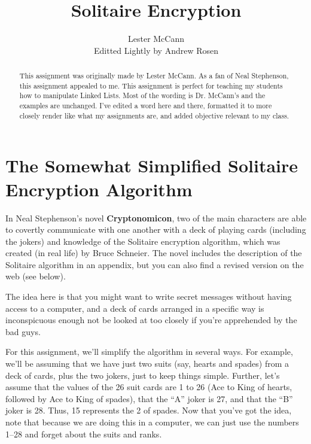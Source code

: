 \documentclass[]{article}
\title{Solitaire Encryption}
\author{Lester McCann\\ Editted Lightly by Andrew Rosen}
\begin{document}
\maketitle
\begin{abstract}
	This assignment was originally made by Lester McCann.  As a fan of Neal Stephenson, this assignment appealed to me.
	This assignment is perfect for teaching my students how to manipulate Linked Lists.  Most of the wording is Dr. McCann's and the examples are unchanged.  I've edited a word here and there, formatted it to more closely render like what my assignments are, and added objective relevant to my class.
\end{abstract}

\section{The Somewhat Simplified Solitaire Encryption Algorithm}


In Neal Stephenson's novel \textbf{Cryptonomicon}, two of the main
characters are able to covertly communicate with one another with a deck
of playing cards (including the jokers) and knowledge of the Solitaire
encryption algorithm, which was created (in real life) by Bruce Schneier.  
The novel includes the description of the Solitaire algorithm in an appendix, but you can also
find a revised version on the web (see below).

The idea here is that you might want to write secret messages without having access to a computer, and a deck of cards arranged in a specific way is inconspicuous enough not be looked at too closely if you're apprehended by the bad guys.


For this assignment, we'll simplify the algorithm in several ways.
For example, we'll be assuming that we have just two suits (say, hearts and spades) from a deck  of cards, plus the two jokers, just to keep things simple.  Further, let's assume that the values of the 26 suit cards are 1 to 26 (Ace to King of hearts, followed by Ace to King of spades), that the ``A'' joker is 27, and that the ``B'' joker is 28.  
Thus, 15 represents the 2 of spades.
Now that you've got the idea, note that because we are doing this in a  computer, we can just use the numbers 1--28 and forget about the suits and
ranks.



\newpage
\end{document}
